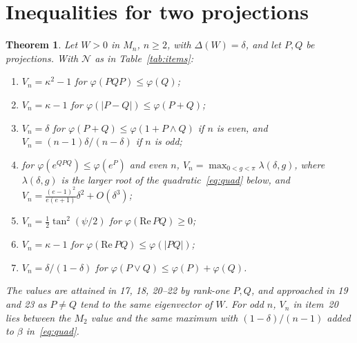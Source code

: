 \documentclass[11pt]{article}
\newcommand{\cN}{\mathcal{N}}
\renewcommand{\Re}{\mathrm{Re}\,}
\theoremstyle{plain}
\newtheorem{theorem}{Theorem}[section]
\theoremstyle{definition}
\theoremstyle{remark}
\begin{document}
\section{Inequalities for two projections}\label{sec:proj}

\begin{theorem}\label{thm:proj}
Let $W>0$ in $M_n$, $n\ge2$, with $\Delta(W)=\delta$, and let $P,Q$ be projections. With $\cN$ as in
Table~\ref{tab:items}:
\begin{enumerate}
\item[(17)] $V_n=\kappa^2-1$ for $\varphi(PQP)\le\varphi(Q)$;
\item[(18)] $V_n=\kappa-1$ for $\varphi(|P-Q|)\le\varphi(P+Q)$;
\item[(19)] $V_n=\delta$ for $\varphi(P+Q)\le\varphi(1+P\wedge Q)$ if $n$ is even, and $V_n=(n-1)\delta/(n-\delta)$ if $n$
is odd;
\item[(20)] for $\varphi(e^{QPQ})\le\varphi(e^P)$ and even $n$, $V_n=\max_{0<g<\pi}\lambda(\delta,g)$, where $\lambda(\delta,g)$ is
the larger root of the quadratic~\eqref{eq:quad} below, and $V_n=\frac{(e-1)^2}{e(e+1)}\delta^2+O(\delta^3)$;
\item[(21)] $V_n=\frac12\tan^2(\psi/2)$ for $\varphi(\Re PQ)\ge0$;
\item[(22)] $V_n=\kappa-1$ for $\varphi(\Re PQ)\le\varphi(|PQ|)$;
\item[(23)] $V_n=\delta/(1-\delta)$ for $\varphi(P\vee Q)\le\varphi(P)+\varphi(Q)$.
\end{enumerate}
The values are attained in 17, 18, 20--22 by rank-one $P,Q$, and approached in 19 and 23 as $P\ne Q$ tend to the same
eigenvector of $W$. For odd $n$, $V_n$ in item~20 lies between the $M_2$ value and the same maximum with
$(1-\delta)/(n-1)$ added to $\beta$ in~\eqref{eq:quad}.
\end{theorem}
\end{document}

